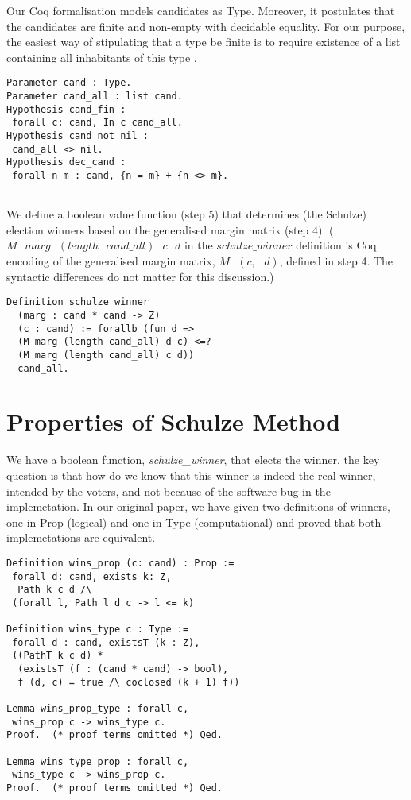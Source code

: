 \documentclass[compsoc,conference,a4paper,10pt,times]{IEEEtran}
\begin{document}
Our Coq formalisation models candidates as Type. Moreover, it postulates that the candidates 
are finite and non-empty with decidable equality. For our purpose, 
the easiest way of stipulating that a type be finite is to require existence of a 
list containing all inhabitants of this type \cite{10.1145/2808098.2808102}.

 \begin{verbatim}
Parameter cand : Type.
Parameter cand_all : list cand.
Hypothesis cand_fin : 
 forall c: cand, In c cand_all.
Hypothesis cand_not_nil : 
 cand_all <> nil.
Hypothesis dec_cand : 
 forall n m : cand, {n = m} + {n <> m}.


\end{verbatim}


We define a boolean value function (step 5) that determines 
(the Schulze) election winners based on 
the generalised margin matrix (step 4). ($M \text{ } marg \text{ } 
(length \text{ } cand\_all) \text{ } c \text{ } d$ 
in the $schulze\_winner$ definition is Coq encoding of the generalised margin matrix, 
$M \text{ } (c, \text{ }d)$, defined in step 4. The syntactic differences do not matter 
for this discussion.)
 \begin{verbatim}
Definition schulze_winner 
  (marg : cand * cand -> Z) 
  (c : cand) := forallb (fun d => 
  (M marg (length cand_all) d c) <=? 
  (M marg (length cand_all) c d))
  cand_all.
\end{verbatim}


\section{Properties of Schulze Method}
	 We have a boolean function,  \textit{schulze\_winner},  that 
	 elects the winner,  the key question is that how do we know that 
	 this winner is indeed the real winner,  intended by the voters, and 
	 not because of the software bug in the implemetation.  In our 
	 original paper, we have given two definitions of 
	 winners, one in Prop (logical) and one in Type (computational) and 
	 proved that both implemetations are equivalent. 
	  
\begin{verbatim}
Definition wins_prop (c: cand) : Prop := 
 forall d: cand, exists k: Z,
  Path k c d /\ 
 (forall l, Path l d c -> l <= k)
	 
Definition wins_type c : Type :=
 forall d : cand, existsT (k : Z),
 ((PathT k c d) *
  (existsT (f : (cand * cand) -> bool), 
  f (d, c) = true /\ coclosed (k + 1) f))
  
Lemma wins_prop_type : forall c, 
 wins_prop c -> wins_type c.
Proof.  (* proof terms omitted *) Qed. 

Lemma wins_type_prop : forall c, 
 wins_type c -> wins_prop c.  
Proof.  (* proof terms omitted *) Qed. 	 
\end{verbatim}
\end{document}
